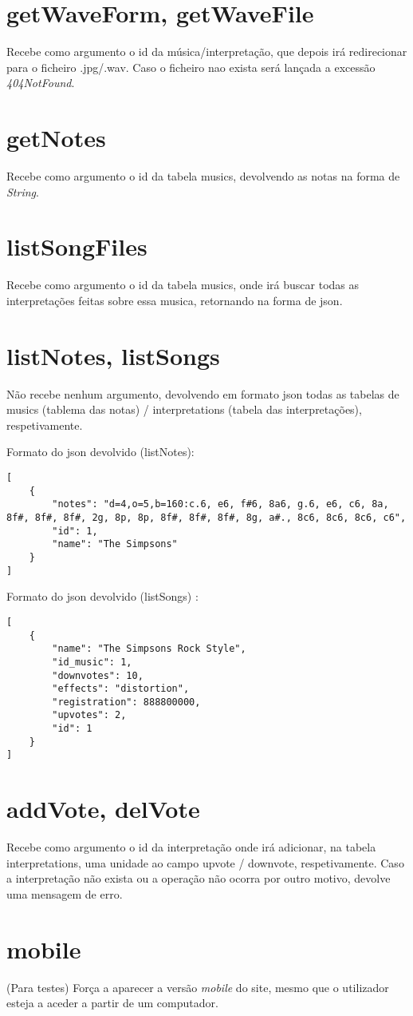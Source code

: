 \section{getWaveForm, getWaveFile}
Recebe como argumento o id da música/interpretação, que depois irá redirecionar para o ficheiro .jpg/.wav. Caso o ficheiro nao exista será lançada a excessão \emph{404NotFound}.

\section{getNotes}
Recebe como argumento o id da tabela musics, devolvendo as notas na forma de \emph{String}.

\section{listSongFiles}
Recebe como argumento o id da tabela musics, onde irá buscar todas as interpretações feitas sobre essa musica, retornando na forma de \ac{json}.

\section{listNotes, listSongs}
Não recebe nenhum argumento, devolvendo em formato \ac{json} todas as tabelas de musics (tablema das notas) / interpretations (tabela das interpretações), respetivamente.

Formato do json devolvido (listNotes):
\begin{lstlisting}
[
	{
		"notes": "d=4,o=5,b=160:c.6, e6, f#6, 8a6, g.6, e6, c6, 8a, 8f#, 8f#, 8f#, 2g, 8p, 8p, 8f#, 8f#, 8f#, 8g, a#., 8c6, 8c6, 8c6, c6",
		"id": 1,
		"name": "The Simpsons"
	}
]
\end{lstlisting}
Formato do json devolvido (listSongs) : 

\begin{lstlisting}
[
	{
		"name": "The Simpsons Rock Style",
		"id_music": 1,
		"downvotes": 10,
		"effects": "distortion",
		"registration": 888800000,
		"upvotes": 2,
		"id": 1
	}
]
\end{lstlisting}

\section{addVote, delVote}
Recebe como argumento o id da interpretação onde irá adicionar, na tabela interpretations, uma unidade ao campo upvote / downvote, respetivamente. Caso a interpretação não exista ou a operação não ocorra por outro motivo, devolve uma mensagem de erro.

\section{mobile}
(Para testes) Força a aparecer a versão \emph{mobile} do site, mesmo que o utilizador esteja a aceder a partir de um computador.